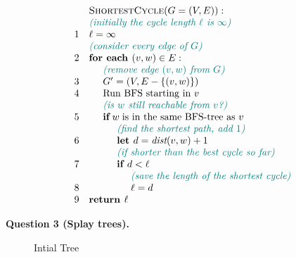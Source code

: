 \documentclass[a4paper,12pt]{article}
\begin{document}
$$\begin{array}{rl}
  & \text{\textsc{ShortestCycle}}(G=(V,E)):\\
  & \textcolor{teal}{\text{\em (initially the cycle length $\ell$ is $\infty$)}}\\
1 & \ell = \infty\\
  & \textcolor{teal}{\text{\em (consider every edge of $G$)}}\\
2 & \text{\textbf{for each\ }} (v,w) \in E:\\
  & \hspace{.5cm} \textcolor{teal}{\text{\em (remove edge $(v,w)$ from $G$)}}\\
3 & \hspace{.5cm} G' = (V,E - \{ (v,w) \})\\
4 & \hspace{.5cm} \text{Run BFS starting in $v$}\\
  & \hspace{.5cm} \textcolor{teal}{\text{\em (is $w$ still reachable from $v$?)}}\\
5 & \hspace{.5cm} \text{\bf if}\;w\;\text{is in the same BFS-tree as $v$}\\
  & \hspace{1.0cm} \textcolor{teal}{\text{\em (find the shortest path, add $1$)}}\\
6 & \hspace{1.0cm} \text{\bf let\ } d  = \text{\em dist}(v,w)+1\\ 
  & \hspace{1.0cm} \textcolor{teal}{\text{\em (if shorter than the best cycle so far)}}\\
7 & \hspace{1.0cm} \text{\bf if\ } d < \ell\\ 
  & \hspace{1.5cm} \textcolor{teal}{\text{\em (save the length of the shortest cycle)}}\\
8 & \hspace{1.5cm} \ell = d\\
9 & \text{\textbf{return\ }} \ell\\
\end{array}$$




\newpage

\vspace{20pt}
{\bf Question 3 (Splay trees).} 

\begin{figure}[!htb]
\caption{\label{fig:splay-tree-initial} Intial Tree}
\end{figure}
\end{document}
